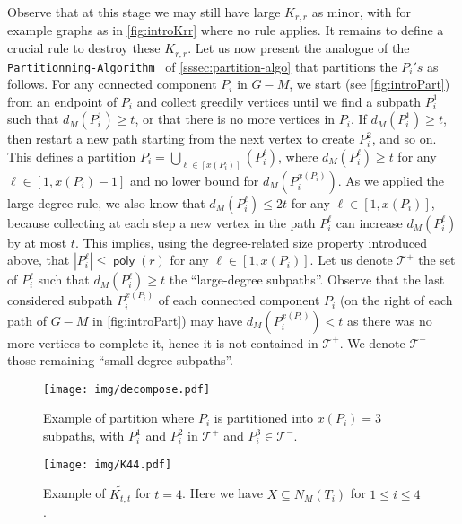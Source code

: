 \documentclass{amsart}
\newcommand{\algopart }{\texttt{Partitionning-Algorithm}~ }
\newcommand{\mT}{\mathcal{T}}
\newcommand{\KttTilde}{\widetilde{K_{t,t}}}
\DeclareMathOperator\poly{\textsf{poly}}
\begin{document}
Observe that at this stage we may still have large $K_{r,r}$ as minor, with for example graphs as in \autoref{fig:introKrr} where no rule applies.
It remains to define a crucial rule to destroy these $K_{r,r}$.
Let us now present the analogue of the \algopart of \autoref{sssec:partition-algo} that partitions the $P_i's$ as follows.
For any connected component $P_i$ in $G-M$, we start (see \autoref{fig:introPart}) from an endpoint of $P_i$ and collect greedily vertices until we find a subpath $P_i^1$ such that $d_M(P_i^1) \ge t$, or that there is no more vertices in $P_i$. If $d_M(P_i^1) \ge t$, then restart a new path starting from the next vertex to create $P_i^2$, and so on.
This defines a partition $P_i=\bigcup_{\ell \in [x(P_i)]}(P_i^\ell)$, where $d_M(P_i^\ell) \ge t$ for any $\ell \in [1,x(P_i)-1]$ and no lower bound for $d_M\left(P_i^{x(P_i)}\right)$.
As we applied the large degree rule, we also know that $d_M(P_i^\ell) \le 2t$ for any $\ell \in [1,x(P_i)]$, because collecting at each step a new vertex in the path $P_i^\ell$ can increase $d_M(P_i^\ell)$  by at most $t$.
This implies, using the degree-related size property introduced above, that $|P_i^\ell| \le \poly(r)$ for any $\ell \in [1,x(P_i)]$.
Let us denote $\mT^+$ the set of $P_i^\ell$ such that $d_M(P_i^\ell) \ge t$ the ``large-degree subpaths''. Observe that the last considered subpath $P_i^{x(P_i)}$ of each connected component $P_i$ (on the right of each path of $G-M$ in \autoref{fig:introPart}) may have $d_M\left(P_i^{x(P_i)}\right)<t$ as there was no more vertices to complete it, hence it is not contained in $\mT^+$. We denote  $\mT^-$ those remaining ``small-degree subpaths''.


\begin{figure}[!ht]
    \centering
    \texttt{[image: img/decompose.pdf]}
    \caption{Example of partition where $P_i$ is partitioned into $x(P_i)=3$ subpaths, with $P_i^1$ and $P_i^2$ in $\mT^+$ and $P_i^3 \in \mT^-$.}
    \label{fig:introPart}
\end{figure}

\begin{figure}[!ht]
    \centering
    \texttt{[image: img/K44.pdf]}
    \caption{Example of $\KttTilde$ for $t=4$. Here we have $X\subseteq N_M(T_i)$ for $1\leq i \leq 4$.}
    \label{fig:introKtttilde}
\end{figure}
\end{document}
